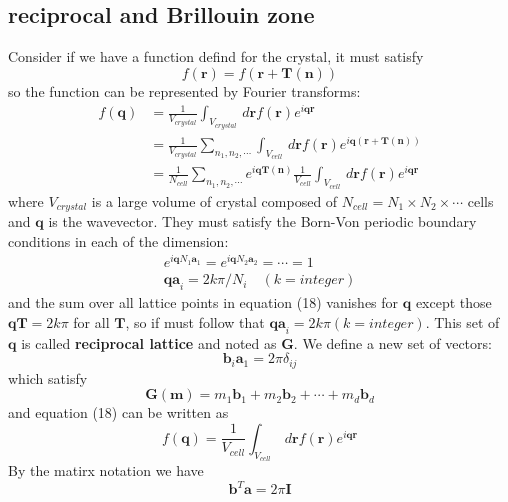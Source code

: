 \documentclass[11pt]{article}
\begin{document}
\subsection{reciprocal and Brillouin zone}
Consider if we have a function defind for the crystal, it must satisfy
\begin{equation}
    f(\mathbf{r})=f(\mathbf{r+T(n)})
\end{equation}
so the function can be represented by Fourier transforms:
\begin{equation}
    \begin{split}
        f(\mathbf{q})&=\frac{1}{V_{crystal}}\int_{V_{crystal}}\,d\mathbf{r}f(\mathbf{r})e^{i\mathbf{qr}}\\
        &=\frac{1}{V_{crystal}}\sum_{n_1,n_2,\cdots}\int_{V_{cell}}\,d\mathbf{r}f(\mathbf{r})e^{i\mathbf{q(r+T(n))}}\\
        &=\frac{1}{N_{cell}}\sum_{n_1,n_2,\cdots}e^{i\mathbf{qT(n)}}\frac{1}{V_{cell}}\int_{V_{cell}}\,d\mathbf{r}f(\mathbf{r})e^{i\mathbf{qr}}
    \end{split}
\end{equation}
where ${V_{crystal}}$ is a large volume of crystal composed of $N_{cell}=N_1\times N_2\times\cdots$ cells and $\mathbf{q}$ is the wavevector.
They must satisfy the Born-Von periodic boundary conditions in each of the dimension:
\begin{gather}
    e^{i\mathbf{q}N_1\mathbf{a}_1}=e^{i\mathbf{q}N_2\mathbf{a}_2}=\cdots=1\\
    \mathbf{qa}_i=2k\pi/N_i\quad(k=integer)
\end{gather} 
and the sum over all lattice points in equation (18) vanishes for $\mathbf{q}$ except those $\mathbf{qT}=2k\pi$ for all $\mathbf{T}$, so if must
follow that $\mathbf{qa}_i=2k\pi(k=integer)$. This set of $\mathbf{q}$ is called \textbf{reciprocal lattice} and noted as $\mathbf{G}$. We define 
a new set of vectors:
\begin{equation}
    \mathbf{b}_i\mathbf{a}_1=2\pi\delta_{ij}
\end{equation}
which satisfy
\begin{equation}
    \mathbf{G(m)}=m_1\textbf{b}_1+m_2\textbf{b}_2+\cdots+m_d\textbf{b}_d
\end{equation}
and equation (18) can be written as
\begin{equation}
    f(\mathbf{q})=\frac{1}{V_{cell}}\int_{V_{cell}}\,d\mathbf{r}f(\mathbf{r})e^{i\mathbf{qr}}
\end{equation}
By the matirx notation we have
\begin{equation}
    \mathbf{b}^{T}\mathbf{a}=2\pi\mathbf{I}
\end{equation}
\end{document}
